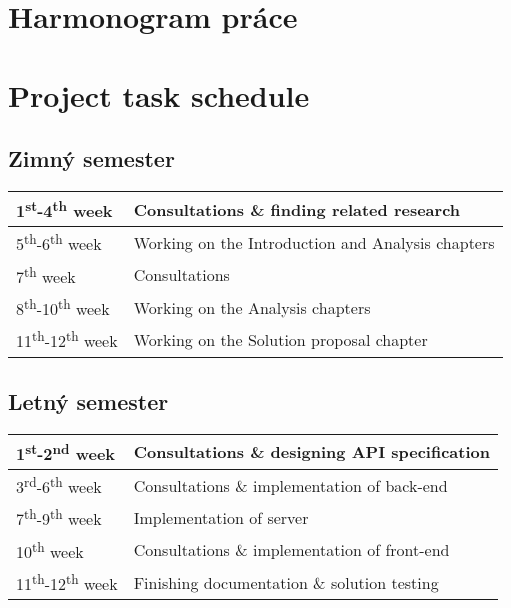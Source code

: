 \thispagestyle{empty}

\ifx\FIITlagEN\undefined
\chapter{Harmonogram práce}
\else
\chapter{Project task schedule}
\fi

\section{Zimný semester}

\begin{tabular}{|l||l|}
\hline
1\textsuperscript{st}-4\textsuperscript{th} week    & Consultations \& finding related research  \\
\hline
5\textsuperscript{th}-6\textsuperscript{th} week    & Working on the Introduction and Analysis chapters  \\
\hline
7\textsuperscript{th} week                          & Consultations  \\
\hline
8\textsuperscript{th}-10\textsuperscript{th} week   & Working on the Analysis chapters  \\
\hline
11\textsuperscript{th}-12\textsuperscript{th} week  & Working on the Solution proposal chapter \\
\hline
\end{tabular}

\section{Letný semester}

\begin{tabular}{|l||l|}
\hline
1\textsuperscript{st}-2\textsuperscript{nd} week    & Consultations \& designing API specification  \\
\hline
3\textsuperscript{rd}-6\textsuperscript{th} week    & Consultations \& implementation of back-end  \\
\hline
7\textsuperscript{th}-9\textsuperscript{th} week    & Implementation of server  \\
\hline
10\textsuperscript{th} week                         & Consultations \& implementation of front-end  \\
\hline
11\textsuperscript{th}-12\textsuperscript{th} week  & Finishing documentation \& solution testing  \\
\hline
\end{tabular}
